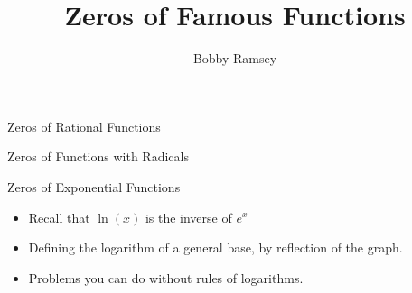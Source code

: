 \documentclass{ximera}
\author{Bobby Ramsey}
\title{Zeros of Famous Functions}
\begin{document}
\begin{abstract}
\end{abstract}
\maketitle


\begin{objectives}

\item Zeros of Rational Functions

\item Zeros of Functions with Radicals

\item Zeros of Exponential Functions
\begin{itemize}
	\item Recall that $\ln(x)$ is the inverse of $e^x$
	\item Defining the logarithm of a general base, by reflection of the graph.
	\item Problems you can do without rules of logarithms.
\end{itemize}



\end{objectives}
\end{document}
